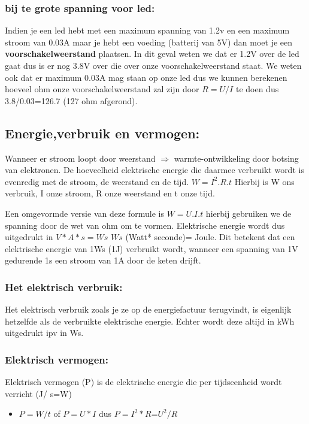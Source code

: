 \documentclass[12pt]{article}
\begin{document}
\subsubsection{\textbf{bij te grote spanning voor led:}}
Indien je een led hebt met een maximum spanning van 1.2v en een maximum stroom van 0.03A maar je hebt een voeding (batterij van 5V) dan moet je een \textbf{voorschakelweerstand} plaatsen.
In dit geval weten we dat er 1.2V over de led gaat dus is er nog 3.8V over die over onze voorschakelweerstand staat. We weten ook dat er maximum 0.03A mag staan op onze led dus we kunnen berekenen hoeveel ohm onze voorschakelweerstand zal zijn door $R=U/I$ te doen
dus 3.8/0.03=126.7 (127 ohm afgerond).
\subsection{Energie,verbruik en vermogen:}
Wanneer er stroom loopt door weerstand $\Rightarrow$ warmte-ontwikkeling door botsing van elektronen. De hoeveelheid elektrische energie die daarmee verbruikt wordt is evenredig met de stroom, de weerstand en de tijd. $W=I^2.R.t$ Hierbij is W ons verbruik, I onze stroom, R onze weerstand en t onze tijd.

Een omgevormde versie van deze formule is $W= U.I.t$ hierbij gebruiken we de spanning door de wet van ohm om te vormen.
Elektrische energie wordt dus uitgedrukt in $V*A*s=Ws$ $Ws$ (Watt* seconde)= Joule.
Dit betekent dat een elektrische energie van 1Ws (1J) verbruikt wordt, wanneer een spanning van 1V gedurende 1s een stroom van 1A door de keten drijft.
\subsubsection{Het elektrisch verbruik:}
Het elektrisch verbruik zoals je ze op de energiefactuur terugvindt, is eigenlijk hetzelfde als de verbruikte elektrische energie.
Echter wordt deze altijd in kWh uitgedrukt ipv in Ws.
\subsubsection{Elektrisch vermogen:}
Elektrisch vermogen (P) is de elektrische energie die per tijdseenheid wordt verricht (J/ s=W)
\begin{itemize}
    \item $P=W/t$ of $P=U*I$ dus $P=I^2*R$=$U^2/R$
\end{itemize}
\end{document}
